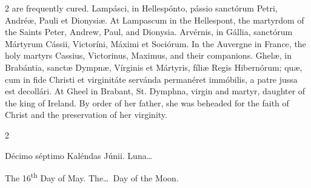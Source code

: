 \begin{paracol}{2}
 are frequently cured.
\switchcolumn*
{}
Lampásci, in 
 Hellespónto, pássio sanctórum Petri, Andréæ, Pauli et Dionysiæ.
\switchcolumn
{}
At Lampascum in the Hellespont, the 
 martyrdom of the Saints Peter, Andrew, Paul, and Dionysia.
\switchcolumn*
{}
Arvérnis, in Gállia, 
 sanctórum Mártyrum Cássii, Victoríni, Máximi et Sociórum.
\switchcolumn
{}
In the Auvergne in France, the holy martyrs 
 Cassius, Victorinus, Maximus, and their companions.
\switchcolumn*
{}
Ghelæ, in Brabántia, 
 sanctæ Dympnæ, Vírginis et Mártyris, fíliæ Regis Hibernórum; quæ, cum in 
 fide Christi et virginitáte servánda permanéret immóbilis, a patre jussa est 
 decollári.
\switchcolumn
{}
At Gheel in Brabant, St. Dymphna, 
 virgin and martyr, daughter of the king of Ireland. By order of her 
 father, she was beheaded for the faith of Christ and the preservation of her 
 virginity.
\switchcolumn*
{}
\end{paracol}


\begin{paracol}{2}
\begin{center}{\color{gregoriocolor} Décimo séptimo Kaléndas Júnii. 
 Luna\dots\ }\end{center}
\switchcolumn
{}
\begin{center}{\color{gregoriocolor} The 16\textsuperscript{th} Day of May. 
 The\dots\ Day of the Moon.}\end{center}
\end{paracol}

